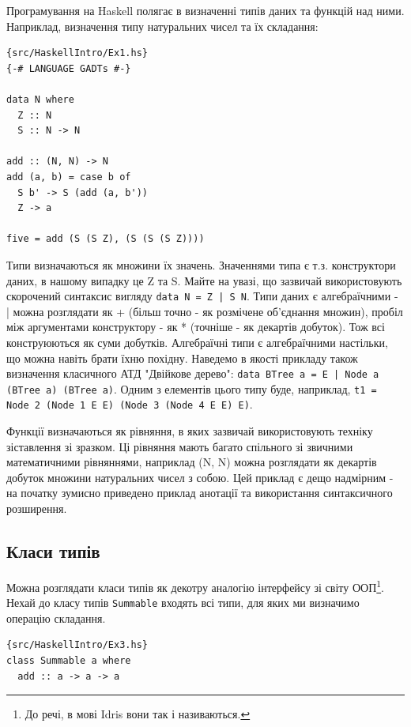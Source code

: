 \documentclass[12pt]{article}
\begin{document}
Програмування на Haskell полягає в визначенні типів даних та функцій над ними. Наприклад, визначення типу 
натуральних чисел та їх складання:\\

\begin{lstlisting}{src/HaskellIntro/Ex1.hs}
{-# LANGUAGE GADTs #-}

data N where
  Z :: N
  S :: N -> N

add :: (N, N) -> N
add (a, b) = case b of
  S b' -> S (add (a, b'))
  Z -> a

five = add (S (S Z), (S (S (S Z))))
\end{lstlisting}

Типи визначаються як множини їх значень. Значеннями типа є т.з. конструктори даних, в нашому випадку це Z та S. 
Майте на увазі, що зазвичай використовують скорочений синтаксис вигляду \lstinline{data N = Z | S N}. 
Типи даних є алгебраїчними - | можна розглядати як + (більш точно - як розмічене об'єднання множин), пробіл між 
аргументами конструктору - як * (точніше - як декартів добуток). Тож всі конструюються як суми добутків. 
Алгебраїчні типи є алгебраїчними настільки, що можна навіть брати їхню похідну. Наведемо в якості прикладу 
також визначення класичного АТД "Двійкове дерево": \lstinline{data BTree a = E | Node a (BTree a) (BTree a)}. 
Одним з елементів цього типу буде, наприклад, \lstinline{t1 = Node 2 (Node 1 E E) (Node 3 (Node 4 E E) E)}.

Функції визначаються як рівняння, в яких зазвичай використовують техніку зіставлення зі зразком. Ці рівняння мають 
багато спільного зі звичними математичними рівняннями, наприклад (N, N) можна розглядати як декартів добуток 
множини натуральних чисел з собою. Цей приклад є дещо надмірним - на початку зумисно приведено приклад 
анотації та використання синтаксичного розширення.\\

\subsection{Класи типів}

Можна розглядати класи типів як декотру аналогію інтерфейсу зі світу ООП\footnote{До речі, в мові Idris вони 
так і називаються.}. Нехай до класу типів \lstinline{Summable} входять всі типи, для яких ми визначимо 
операцію складання.\\

\begin{lstlisting}{src/HaskellIntro/Ex3.hs}
class Summable a where
  add :: a -> a -> a
\end{lstlisting}
\end{document}
